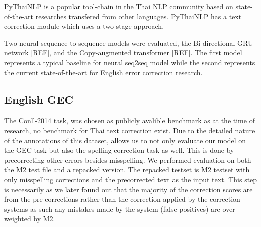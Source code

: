PyThaiNLP is a popular tool-chain in the Thai NLP community based on state-of-the-art researches transfered from other languages. PyThaiNLP has a text correction module which uses a two-stage approach.

Two neural sequence-to-sequence models were evaluated, the Bi-directional GRU network [REF], and the Copy-augmented transformer [REF]. The first model represents a typical baseline for neural seq2seq model while the second represents the current state-of-the-art for English error correction research.

\subsection{English GEC}

The Conll-2014 task, was chosen as publicly avalible benchmark as at the time of research, no benchmark for Thai text correction exist. Due to the detailed nature of the annotations of this dataset, allows us to not only evaluate our model on the GEC task but also the spelling correction task as well. This is done by precorrecting other errors besides misspelling. We performed evaluation on both the M2 test file and a repacked version. The repacked testset is M2 testset with only misspelling corrections and the precorrected text as the input text. This step is necessarily as we later found out that the majority of the correction scores are from the pre-corrections rather than the correction applied by the correction systems as such any mistakes made by the system (false-positives) are over weighted by M2.
